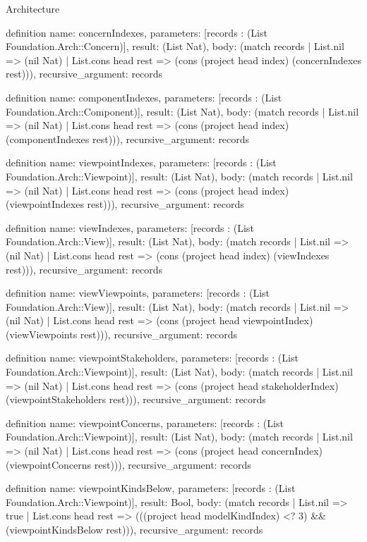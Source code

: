 \begin{lexlean}{Architecture}
\begin{semanticmodule}
definition{
  name: concernIndexes,
  parameters: [records : (List Foundation.Arch::Concern)],
  result: (List Nat),
  body: (match records
    | List.nil => (nil Nat)
    | List.cons head rest => (cons (project head index) (concernIndexes rest))),
  recursive_argument: records
}

definition{
  name: componentIndexes,
  parameters: [records : (List Foundation.Arch::Component)],
  result: (List Nat),
  body: (match records
    | List.nil => (nil Nat)
    | List.cons head rest => (cons (project head index) (componentIndexes rest))),
  recursive_argument: records
}

definition{
  name: viewpointIndexes,
  parameters: [records : (List Foundation.Arch::Viewpoint)],
  result: (List Nat),
  body: (match records
    | List.nil => (nil Nat)
    | List.cons head rest => (cons (project head index) (viewpointIndexes rest))),
  recursive_argument: records
}

definition{
  name: viewIndexes,
  parameters: [records : (List Foundation.Arch::View)],
  result: (List Nat),
  body: (match records
    | List.nil => (nil Nat)
    | List.cons head rest => (cons (project head index) (viewIndexes rest))),
  recursive_argument: records
}

definition{
  name: viewViewpoints,
  parameters: [records : (List Foundation.Arch::View)],
  result: (List Nat),
  body: (match records
    | List.nil => (nil Nat)
    | List.cons head rest => (cons (project head viewpointIndex) (viewViewpoints rest))),
  recursive_argument: records
}

definition{
  name: viewpointStakeholders,
  parameters: [records : (List Foundation.Arch::Viewpoint)],
  result: (List Nat),
  body: (match records
    | List.nil => (nil Nat)
    | List.cons head rest => (cons (project head stakeholderIndex) (viewpointStakeholders rest))),
  recursive_argument: records
}

definition{
  name: viewpointConcerns,
  parameters: [records : (List Foundation.Arch::Viewpoint)],
  result: (List Nat),
  body: (match records
    | List.nil => (nil Nat)
    | List.cons head rest => (cons (project head concernIndex) (viewpointConcerns rest))),
  recursive_argument: records
}

definition{
  name: viewpointKindsBelow,
  parameters: [records : (List Foundation.Arch::Viewpoint)],
  result: Bool,
  body: (match records
    | List.nil => true
    | List.cons head rest => (((project head modelKindIndex) <? 3) && (viewpointKindsBelow rest))),
  recursive_argument: records
}


\end{semanticmodule}
\end{lexlean}
